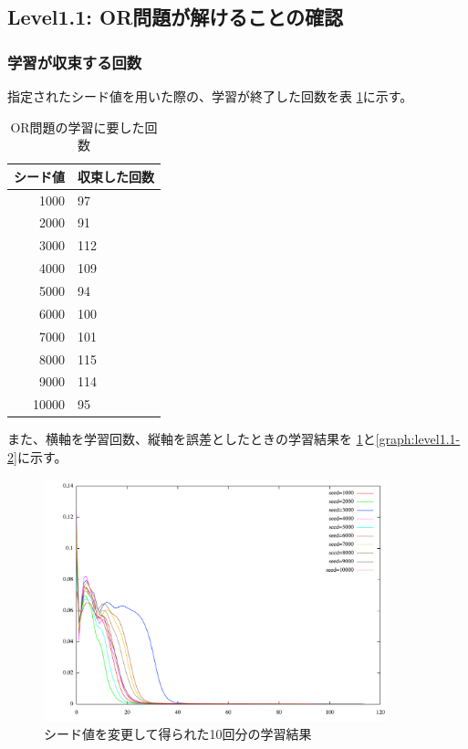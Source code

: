 \subsection{Level1.1: OR問題が解けることの確認}
\subsubsection{学習が収束する回数}
指定されたシード値を用いた際の、学習が終了した回数を表
\ref{table:level1.1}に示す。

\begin{table}[htb]
 \begin{center}
  \caption{OR問題の学習に要した回数}
  \label{table:level1.1}
  \begin{tabular}[htb]{r|l} \hline
   シード値 & 収束した回数 \\ \hline \hline
   1000 & 97 \\ \hline
   2000 & 91 \\ \hline
   3000 & 112 \\ \hline
   4000 & 109 \\ \hline
   5000 & 94 \\ \hline
   6000 & 100 \\ \hline
   7000 & 101 \\ \hline
   8000 & 115 \\ \hline
   9000 & 114 \\ \hline
   10000 & 95 \\ \hline
  \end{tabular}
 \end{center}
\end{table}

また、横軸を学習回数、縦軸を誤差としたときの学習結果を
\ref{graph:level1.1-1}と\ref{graph:level1.1-2}に示す。

\begin{figure}[h]
 \begin{center}
  \includegraphics[width=10.0cm]{level1/ex.pdf}
  \caption{シード値を変更して得られた10回分の学習結果}
  \label{graph:level1.1-1}
 \end{center}
\end{figure}

